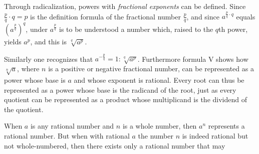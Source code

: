 Through radicalization, powers with \textit{fractional exponents} can be defined. Since $\frac{p}{q} \cdot q = p$ is the definition formula of the fractional number $\frac{p}{q}$, and since $a^{\frac{p}{q} \cdot q}$ equals $(a^\frac{p}{q})^{q}$, under $a^{\frac{p}{q}}$ is to be understood a number which, raised to the $q$th power, yields $a^p$, and this is $\sqrt[q]{a^p}$.

Similarly one recognizes that $a^{-\frac{p}{q}} = 1 : \sqrt[q]{a^p}$. Furthermore formula V shows how $\sqrt[n]{a}$, where $n$ is a positive or negative fractional number, can be represented as a power whose base is $a$ and whose exponent is rational. Every root can thus be represented as a power whose base is the radicand of the root, just as every quotient can be represented as a product whose multiplicand is the dividend of the quotient.

When $a$ is any rational number and $n$ is a whole number, then $a^n$ represents a rational number. But when with rational $a$ the number $n$ is indeed rational but not whole-numbered, then there exists only a rational number that may
